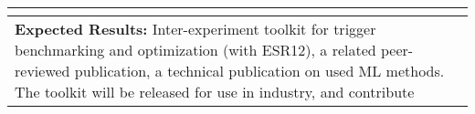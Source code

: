 \begin{center}
{\begin{tabular}{|p{21mm}|p{19mm}|p{15mm}|p{8mm}p{12mm}|p{19mm}|p{39mm}|p{38mm}|}
{%
}\tabularnewline\hline
\multicolumn{8}{|p{20.2cm}|}{\textbf{\Tstrut Expected Results:}
Inter-experiment toolkit for trigger benchmarking and optimization (with ESR12), 
a related peer-reviewed publication, a technical publication on used ML methods. The toolkit will be released for use in industry, and contribute
}
\end{tabular}}
\end{center}
